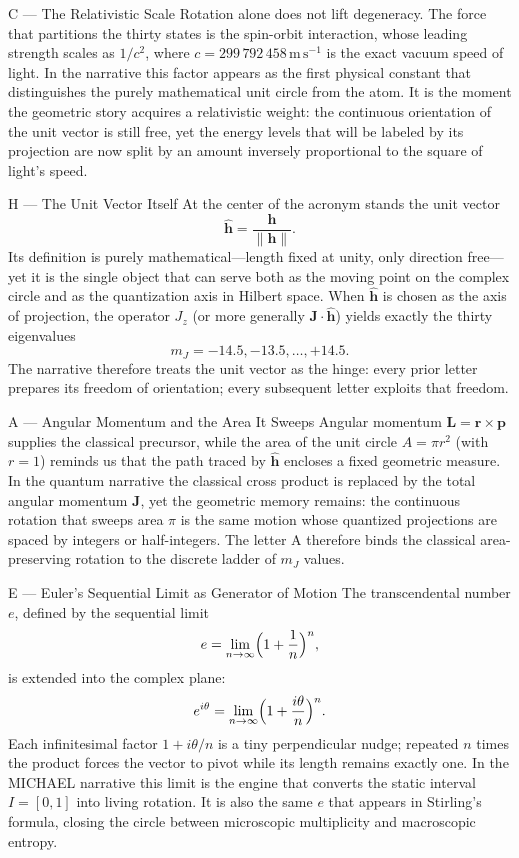 C — The Relativistic Scale
Rotation alone does not lift degeneracy. The force that partitions the thirty states is the spin-orbit interaction, whose leading strength scales as \(1/c^{2}\), where \(c=299\,792\,458\,\mathrm{m\,s^{-1}}\) is the exact vacuum speed of light. In the narrative this factor appears as the first physical constant that distinguishes the purely mathematical unit circle from the atom. It is the moment the geometric story acquires a relativistic weight: the continuous orientation of the unit vector is still free, yet the energy levels that will be labeled by its projection are now split by an amount inversely proportional to the square of light’s speed.

H — The Unit Vector Itself
At the center of the acronym stands the unit vector
\[
\hat{\mathbf{h}}=\frac{\mathbf{h}}{\|\mathbf{h}\|}.
\]
Its definition is purely mathematical—length fixed at unity, only direction free—yet it is the single object that can serve both as the moving point on the complex circle and as the quantization axis in Hilbert space. When \(\hat{\mathbf{h}}\) is chosen as the axis of projection, the operator \(J_{z}\) (or more generally \(\mathbf{J}\cdot\hat{\mathbf{h}}\)) yields exactly the thirty eigenvalues
\[
m_{J}=-14.5,-13.5,\dots,+14.5.
\]
The narrative therefore treats the unit vector as the hinge: every prior letter prepares its freedom of orientation; every subsequent letter exploits that freedom.

A — Angular Momentum and the Area It Sweeps
Angular momentum \(\mathbf{L}=\mathbf{r}\times\mathbf{p}\) supplies the classical precursor, while the area of the unit circle \(A=\pi r^{2}\) (with \(r=1\)) reminds us that the path traced by \(\hat{\mathbf{h}}\) encloses a fixed geometric measure. In the quantum narrative the classical cross product is replaced by the total angular momentum \(\mathbf{J}\), yet the geometric memory remains: the continuous rotation that sweeps area \(\pi\) is the same motion whose quantized projections are spaced by integers or half-integers. The letter A therefore binds the classical area-preserving rotation to the discrete ladder of \(m_{J}\) values.

E — Euler’s Sequential Limit as Generator of Motion
The transcendental number \(e\), defined by the sequential limit
\[
e=\lim_{n\to\infty}\Bigl(1+\frac{1}{n}\Bigr)^{n},
\]
is extended into the complex plane:
\[
e^{i\theta}=\lim_{n\to\infty}\Bigl(1+\frac{i\theta}{n}\Bigr)^{n}.
\]
Each infinitesimal factor \(1+i\theta/n\) is a tiny perpendicular nudge; repeated \(n\) times the product forces the vector to pivot while its length remains exactly one. In the MICHAEL narrative this limit is the engine that converts the static interval \(I=[0,1]\) into living rotation. It is also the same \(e\) that appears in Stirling’s formula, closing the circle between microscopic multiplicity and macroscopic entropy.

